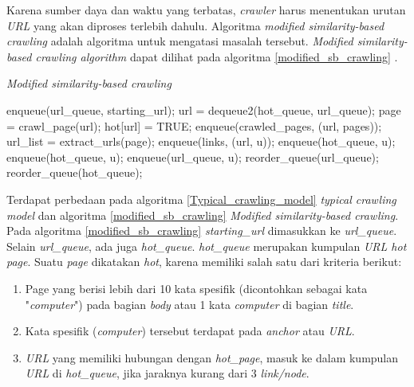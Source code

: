 Karena sumber daya dan waktu yang terbatas, \textit{crawler} harus menentukan urutan \textit{URL} yang akan diproses terlebih dahulu. Algoritma \emph{modified similarity-based crawling} adalah algoritma untuk mengatasi masalah tersebut. \emph{Modified similarity-based crawling algorithm} dapat dilihat pada algoritma \ref{modified_sb_crawling} \citep{cho1998efficient}.

\begin{algorithm}[H]
	\caption{\emph{Modified similarity-based crawling} \citep{cho1998efficient}}
	\label{modified_sb_crawling}
	\begin{algorithmic}[1]
		\State enqueue(url\_queue, starting\_url);
			\State url = dequeue2(hot\_queue, url\_queue);
			\State page = crawl\_page(url);
				\State hot[url] = TRUE;
			\EndIf
			\State enqueue(crawled\_pages, (url, pages));
			\State url\_list = extract\_urls(page);
			\State enqueue(links, (url, u));
					\State enqueue(hot\_queue, u);
					\State enqueue(hot\_queue, u);
				\Else
					\State enqueue(url\_queue, u);
				\EndIf
			\EndIf
			\State reorder\_queue(url\_queue);
			\State reorder\_queue(hot\_queue);
			\EndFor
		\EndWhile
	\end{algorithmic}
\end{algorithm}

Terdapat perbedaan pada algoritma \ref{Typical_crawling_model} \emph{typical crawling model} dan algoritma \ref{modified_sb_crawling} \emph{Modified similarity-based crawling}. Pada algoritma \ref{modified_sb_crawling} \emph{starting\_url} dimasukkan ke \emph{url\_queue}. Selain \emph{url\_queue}, ada juga \emph{hot\_queue}. \emph{hot\_queue} merupakan kumpulan \emph{URL hot page}. Suatu \emph{page} dikatakan \emph{hot}, karena memiliki salah satu dari kriteria berikut:

\begin{enumerate}
	\item Page yang berisi lebih dari 10 kata spesifik (dicontohkan sebagai kata "\emph{computer}") pada bagian \emph{body} atau 1 kata \emph{computer} di bagian \emph{title}.
	\item Kata spesifik (\emph{computer}) tersebut terdapat pada \emph{anchor} atau \emph{URL}.
	\item \emph{URL} yang memiliki hubungan dengan \emph{hot\_page}, masuk ke dalam kumpulan \emph{URL} di \emph{hot\_queue}, jika jaraknya kurang dari 3 \emph{link/node}.
\end{enumerate}

